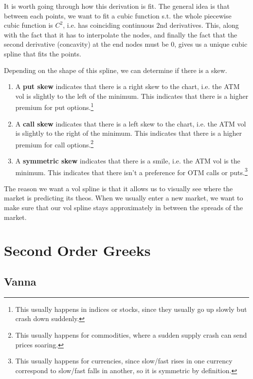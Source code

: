 \documentclass{article}
\begin{document}
    It is worth going through how this derivation is fit. The general idea is that between each points, we want to fit a cubic function s.t. the whole piecewise cubic function is $C^2$, i.e. has coinciding continuous 2nd derivatives. This, along with the fact that it has to interpolate the nodes, and finally the fact that the second derivative (concavity) at the end nodes must be $0$, gives us a unique cubic spline that fits the points. 

    \begin{definition}[Skew]
      Depending on the shape of this spline, we can determine if there is a skew. 
      \begin{enumerate}
        \item A \textbf{put skew} indicates that there is a right skew to the chart, i.e. the ATM vol is slightly to the left of the minimum. This indicates that there is a higher premium for put options.\footnote{This usually happens in indices or stocks, since they usually go up slowly but crash down suddenly. }

        \item A \textbf{call skew} indicates that there is a left skew to the chart, i.e. the ATM vol is slightly to the right of the minimum. This indicates that there is a higher premium for call options.\footnote{This usually happens for commodities, where a sudden supply crash can send prices soaring. }

        \item A \textbf{symmetric skew} indicates that there is a smile, i.e. the ATM vol is the minimum. This indicates that there isn't a preference for OTM calls or puts.\footnote{This usually happens for currencies, since slow/fast rises in one currency correspond to slow/fast falls in another, so it is symmetric by definition. }
      \end{enumerate}
    \end{definition}

    The reason we want a vol spline is that it allows us to visually see where the market is predicting its theos. When we usually enter a new market, we want to make sure that our vol spline stays approximately in between the spreads of the market. 

\section{Second Order Greeks}

  \subsection{Vanna}
\end{document}

